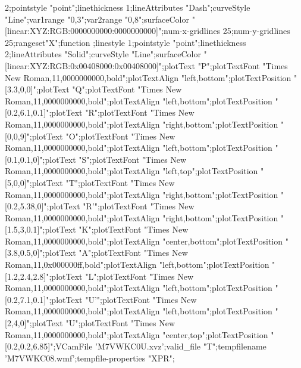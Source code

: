 \documentclass{article}
\begin{document}
{{2;pointstyle "point";linethickness 1;lineAttributes "Dash";curveStyle
"Line";var1range "0,3";var2range "0,8";surfaceColor
"[linear:XYZ:RGB:0000000000:0000000000]";num-x-gridlines 25;num-y-gridlines
25;rangeset"X";function
;linestyle 1;pointstyle "point";linethickness
2;lineAttributes "Solid";curveStyle "Line";surfaceColor
"[linear:XYZ:RGB:0x00408000:0x00408000]";plotText "P";plotTextFont "Times
New Roman,11,0000000000,bold";plotTextAlign "left,bottom";plotTextPosition
"[3.3,0,0]";plotText "Q";plotTextFont "Times New
Roman,11,0000000000,bold";plotTextAlign "left,bottom";plotTextPosition
"[0.2,6.1,0.1]";plotText "R";plotTextFont "Times New
Roman,11,0000000000,bold";plotTextAlign "right,bottom";plotTextPosition
"[0,0,9]";plotText "O";plotTextFont "Times New
Roman,11,0000000000,bold";plotTextAlign "left,bottom";plotTextPosition
"[0.1,0.1,0]";plotText "S";plotTextFont "Times New
Roman,11,0000000000,bold";plotTextAlign "left,top";plotTextPosition
"[5,0,0]";plotText "T";plotTextFont "Times New
Roman,11,0000000000,bold";plotTextAlign "right,bottom";plotTextPosition
"[0.2,5.38,0]";plotText "R'";plotTextFont "Times New
Roman,11,0000000000,bold";plotTextAlign "right,bottom";plotTextPosition
"[1.5,3,0.1]";plotText "K";plotTextFont "Times New
Roman,11,0000000000,bold";plotTextAlign "center,bottom";plotTextPosition
"[3.8,0.5,0]";plotText "A";plotTextFont "Times New
Roman,11,0x000000ff,bold";plotTextAlign "left,bottom";plotTextPosition
"[1.2,2.4,2.8]";plotText "L";plotTextFont "Times New
Roman,11,0000000000,bold";plotTextAlign "left,bottom";plotTextPosition
"[0.2,7.1,0.1]";plotText "U'";plotTextFont "Times New
Roman,11,0000000000,bold";plotTextAlign "left,bottom";plotTextPosition
"[2,4,0]";plotText "U";plotTextFont "Times New
Roman,11,0000000000,bold";plotTextAlign "center,top";plotTextPosition
"[0.2,0.2,6.85]";VCamFile 'M7VWKC0U.xvz';valid_file "T";tempfilename
'M7VWKC08.wmf';tempfile-properties "XPR";}}
\end{document}
